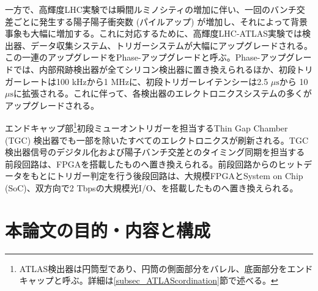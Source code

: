 一方で、高輝度LHC実験では瞬間ルミノシティの増加に伴い、一回のバンチ交差ごとに発生する陽子陽子衝突数 (パイルアップ) が増加し、それによって背景事象も大幅に増加する。これに対応するために、高輝度LHC-ATLAS実験では検出器、データ収集システム、トリガーシステムが大幅にアップグレードされる。この一連のアップグレードをPhase-\two アップグレードと呼ぶ。Phase-\two アップグレードでは、内部飛跡検出器が全てシリコン検出器に置き換えられるほか、初段トリガーレートは100 kHzから1 MHzに、初段トリガーレイテンシーは2.5 $\mu\mathrm{s}$から 10 $\mu\mathrm{s}$に拡張される。これに伴って、各検出器のエレクトロニクスシステムの多くがアップグレードされる。

エンドキャップ部\footnote{ATLAS検出器は円筒型であり、円筒の側面部分をバレル、底面部分をエンドキャップと呼ぶ。詳細は\ref{subsec_ATLAScordination}節で述べる。}初段ミューオントリガーを担当するThin Gap Chamber (TGC) 検出器でも一部を除いたすべてのエレクトロニクスが刷新される。TGC検出器信号のデジタル化および陽子バンチ交差とのタイミング同期を担当する前段回路は、FPGAを搭載したものへ置き換えられる。前段回路からのヒットデータをもとにトリガー判定を行う後段回路は、大規模FPGAとSystem on Chip (SoC)、双方向で2 Tbpsの大規模光I/O、を搭載したものへ置き換えられる。





\section{本論文の目的・内容と構成}
\label{sec_intro_purpose}

